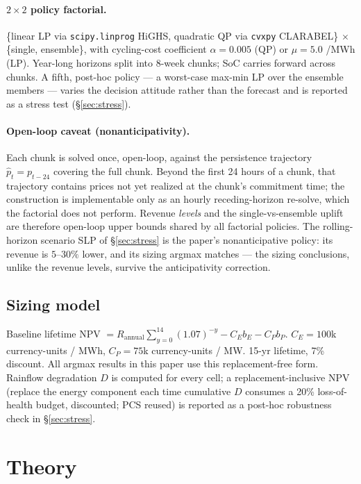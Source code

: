 \documentclass[11pt]{article}
\begin{document}
\paragraph{$2 \times 2$ policy factorial.} \{linear LP via \texttt{scipy.linprog} HiGHS, quadratic QP via \texttt{cvxpy} CLARABEL\} $\times$ \{single, ensemble\}, with cycling-cost coefficient $\alpha = 0.005$ (QP) or $\mu = 5.0$ /MWh (LP). Year-long horizons split into 8-week chunks; SoC carries forward across chunks. A fifth, post-hoc policy --- a worst-case max-min LP over the ensemble members --- varies the decision attitude rather than the forecast and is reported as a stress test (\S\ref{sec:stress}).

\paragraph{Open-loop caveat (nonanticipativity).} Each chunk is solved once, open-loop, against the persistence trajectory $\hat p_t = p_{t-24}$ covering the full chunk. Beyond the first 24 hours of a chunk, that trajectory contains prices not yet realized at the chunk's commitment time; the construction is implementable only as an hourly receding-horizon re-solve, which the factorial does not perform. Revenue \emph{levels} and the single-vs-ensemble uplift are therefore open-loop upper bounds shared by all factorial policies. The rolling-horizon scenario SLP of \S\ref{sec:stress} is the paper's nonanticipative policy: its revenue is $5$--$30\%$ lower, and its sizing argmax matches --- the sizing conclusions, unlike the revenue levels, survive the anticipativity correction.

\subsection{Sizing model}

Baseline lifetime NPV $= R_{\mathrm{annual}} \sum_{y=0}^{14} (1.07)^{-y} - C_E b_E - C_P b_P$. $C_E = 100$k currency-units / MWh, $C_P = 75$k currency-units / MW. 15-yr lifetime, 7\% discount. All argmax results in this paper use this replacement-free form. Rainflow degradation $D$ is computed for every cell; a replacement-inclusive NPV (replace the energy component each time cumulative $D$ consumes a 20\% loss-of-health budget, discounted; PCS reused) is reported as a post-hoc robustness check in \S\ref{sec:stress}.

\section{Theory}\label{sec:theory}
\end{document}
